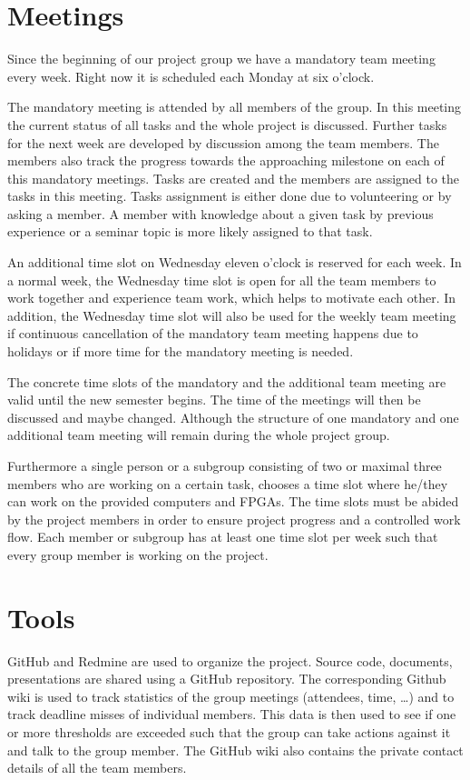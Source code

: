 \section{Meetings}
Since the beginning of our project group we have a mandatory team meeting every week.
Right now it is scheduled each Monday at six o'clock.

The mandatory meeting is attended by all members of the group.
In this meeting the current status of all tasks and the whole project is discussed.
Further tasks for the next week are developed by discussion among the team members.
The members also track the progress towards the approaching milestone on each of this mandatory meetings.
Tasks are created and the members are assigned to the tasks in this meeting. Tasks assignment is either done due to volunteering or by asking a member.
A member with knowledge about a given task by previous experience or a seminar topic is  more likely assigned to that task.

An additional time slot on Wednesday eleven o'clock is reserved for each week.
In a normal week, the Wednesday time slot is open for all the team members to work together and experience team work, which helps to motivate each other.
In addition, the Wednesday time slot will also be used for the weekly team meeting if continuous cancellation of the mandatory team meeting happens due to holidays
or if more time for the mandatory meeting is needed.

The concrete time slots of the mandatory and the additional team meeting are valid until the new semester begins. The time of the meetings will then be discussed and maybe changed. Although the structure of one mandatory and one additional team meeting will remain during the whole project group.

Furthermore a single person or a subgroup consisting of two or maximal three members who are working on a certain task, chooses a time slot where he/they can work on the provided computers and \ac{FPGA}s.
The time slots must be abided by the project members in order to ensure project progress and a controlled work flow.
Each member or subgroup has at least one time slot per week such that every group member is working on the project.

\section{Tools}

GitHub and Redmine are used to organize the project.
Source code, documents, presentations are shared using a GitHub repository.
The corresponding Github wiki is used to track statistics of the group meetings (attendees, time, \dots) and to track deadline misses of individual members.
This data is then used to see if one or more thresholds are exceeded such that the group can take actions against it and talk to the group member.
The GitHub wiki also contains the private contact details of all the team members.

